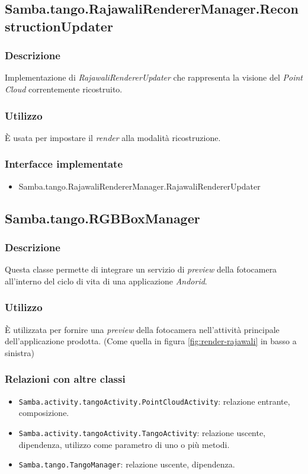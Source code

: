 \subsection{Samba.tango.RajawaliRendererManager.ReconstructionUpdater}
\subsubsection{Descrizione}
Implementazione di \emph{RajawaliRendererUpdater} che rappresenta la visione del \emph{Point Cloud} correntemente ricostruito.
\subsubsection{Utilizzo}
È usata per impostare il \emph{render} alla modalità ricostruzione.
\subsubsection{Interfacce implementate}
\begin{itemize}
	\item Samba.tango.RajawaliRendererManager.RajawaliRendererUpdater
\end{itemize}

\subsection{Samba.tango.RGBBoxManager}
\subsubsection{Descrizione}
Questa classe permette di integrare un servizio di \emph{preview} della fotocamera all'interno del ciclo di vita di una applicazione \emph{Andorid}.
\subsubsection{Utilizzo}
È utilizzata per fornire una \emph{preview} della fotocamera nell'attività principale dell'applicazione prodotta. (Come quella in figura \ref{fig:render-rajawali} in basso a sinistra)
\subsubsection{Relazioni con altre classi}
\begin{itemize}
	\item \texttt{Samba.activity.tangoActivity.PointCloudActivity}: relazione entrante, composizione.
	\item \texttt{Samba.activity.tangoActivity.TangoActivity}: relazione uscente, dipendenza, utilizzo come parametro di uno o più metodi.
	\item \texttt{Samba.tango.TangoManager}: relazione uscente, dipendenza.
\end{itemize}

